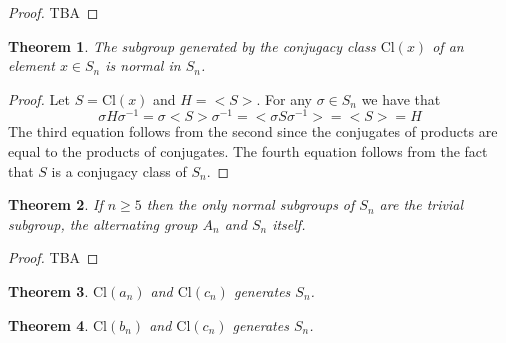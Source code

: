 \documentclass[a4paper,10pt]{article}
\newtheorem{theorem}{Theorem}
\begin{document}
\begin{proof}
TBA
\end{proof}

\begin{theorem}
The subgroup generated by the conjugacy class $\textrm{Cl}(x)$ of an element $x \in S_n$ is normal in $S_n$.   
\end{theorem}
\begin{proof}
Let $S = \textrm{Cl}(x)$ and $H = <S>$. For any $\sigma\in S_n$ we have that
\begin{equation}
\sigma H \sigma^{-1} = \sigma <S> \sigma^{-1} = <\sigma S \sigma^{-1}> = <S> = H 
\end{equation}
The third equation follows from the second since the conjugates of products are equal to the products of conjugates. The fourth equation follows from the fact that $S$ is a conjugacy class of $S_n$.
\end{proof}

\begin{theorem}
If $n \geq 5$ then the only normal subgroups of $S_n$ are the trivial subgroup, the alternating group $A_n$ and $S_n$ itself. 
\end{theorem}
\begin{proof}
TBA 
\end{proof}

\begin{theorem}
$\textrm{Cl}(a_n)$ and $\textrm{Cl}(c_n)$ generates $S_n$. 
\end{theorem}

\begin{theorem}
$\textrm{Cl}(b_n)$ and $\textrm{Cl}(c_n)$ generates $S_n$. 
\end{theorem}
\end{document}
